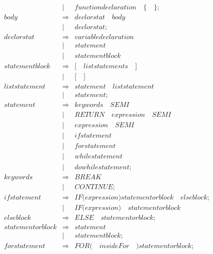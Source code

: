 \documentclass{article}
\begin{document}
\begin{eqnarray}
   & | & \mathit{functiondeclaration} \quad \mathit{\{} \quad \mathit{\}} ;  \\
   \mathit{body} & \Rightarrow & \mathit{declorstat} \quad \mathit{body} \\
   & | & \mathit{declorstat} ; \\
   \mathit{declorstat} & \Rightarrow & \mathit{variabledeclaration} \\
   & | & \mathit{statement}\\
   & | & \mathit{statementblock} \\
   \mathit{statementblock} & \Rightarrow & \mathit{[} \quad \mathit{liststatements} \quad \mathit{]}\\
   & | & \mathit{[} \quad \mathit{]}\\
   \mathit{liststatement} & \Rightarrow & \mathit{statement} \quad \mathit{liststatement} \\
   & | & \mathit{statement} ; \\
   \mathit{statement} & \Rightarrow & \mathit{keywords} \quad \mathit{SEMI}\\
   & | & \mathit{RETURN} \quad \mathit{expression} \quad \mathit{SEMI}\\
   & | & \mathit{expression} \quad \mathit{SEMI} \\
   & | & \mathit{ifstatement} \\
   & | & \mathit{forstatement} \\
   & | & \mathit{whilestatement} \\
   & | & \mathit{dowhilestatement} ;\\
   \mathit{keywords} & \Rightarrow & \mathit{BREAK} \\
   & | & \mathit{CONTINUE};\\
   \mathit{ifstatement} & \Rightarrow & \mathit{IF} \mathit{(} \mathit{expression} \mathit{)} \mathit{statementorblock} \quad \mathit{elseblock} ;\\
   & | & \mathit{IF} \mathit{(} \mathit{expression} \mathit{)} \quad \mathit{statementorblock} \\
   \mathit{elseblock} & \Rightarrow & \mathit{ELSE} \quad \mathit{statementorblock} ; \\
   \mathit{statementorblock} & \Rightarrow & \mathit{statement} \\
   &| & \mathit{statementblock};\\
   \mathit{forstatement} & \Rightarrow & \mathit{FOR} \mathit{(} \quad \mathit{insideFor}\quad\mathit{)} \mathit{statementorblock};\\

\end{eqnarray}
\end{document}
